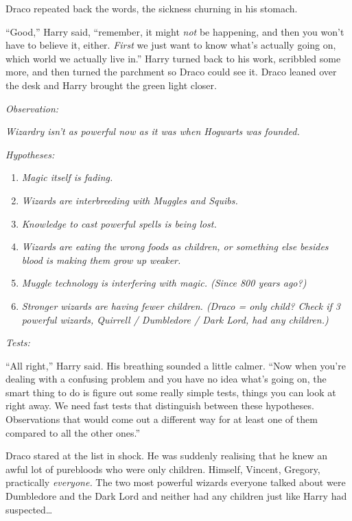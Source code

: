 Draco repeated back the words, the sickness churning in his stomach.

``Good,'' Harry said, ``remember, it might \emph{not} be happening, and
then you won't have to believe it, either. \emph{First} we just want to
know what's actually going on, which world we actually live in.'' Harry
turned back to his work, scribbled some more, and then turned the
parchment so Draco could see it. Draco leaned over the desk and Harry
brought the green light closer.

\emph{Observation:}

\emph{Wizardry isn't as powerful now as it was when Hogwarts was
founded.}

\emph{Hypotheses:}

\begin{enumerate}
\def\labelenumi{\arabic{enumi}.}
\itemsep1pt\parskip0pt
\item
  \emph{Magic itself is fading.}\\
\item
  \emph{Wizards are interbreeding with Muggles and Squibs.}\\
\item
  \emph{Knowledge to cast powerful spells is being lost.}\\
\item
  \emph{Wizards are eating the wrong foods as children, or something
  else besides blood is making them grow up weaker.}\\
\item
  \emph{Muggle technology is interfering with magic. (Since 800 years
  ago?)}\\
\item
  \emph{Stronger wizards are having fewer children. (Draco = only child?
  Check if 3 powerful wizards, Quirrell / Dumbledore / Dark Lord, had
  any children.)}
\end{enumerate}

\emph{Tests:}

``All right,'' Harry said. His breathing sounded a little calmer. ``Now
when you're dealing with a confusing problem and you have no idea what's
going on, the smart thing to do is figure out some really simple tests,
things you can look at right away. We need fast tests that distinguish
between these hypotheses. Observations that would come out a different
way for at least one of them compared to all the other ones.''

Draco stared at the list in shock. He was suddenly realising that he
knew an awful lot of purebloods who were only children. Himself,
Vincent, Gregory, practically \emph{everyone.} The two most powerful
wizards everyone talked about were Dumbledore and the Dark Lord and
neither had any children just like Harry had suspected\ldots{}

